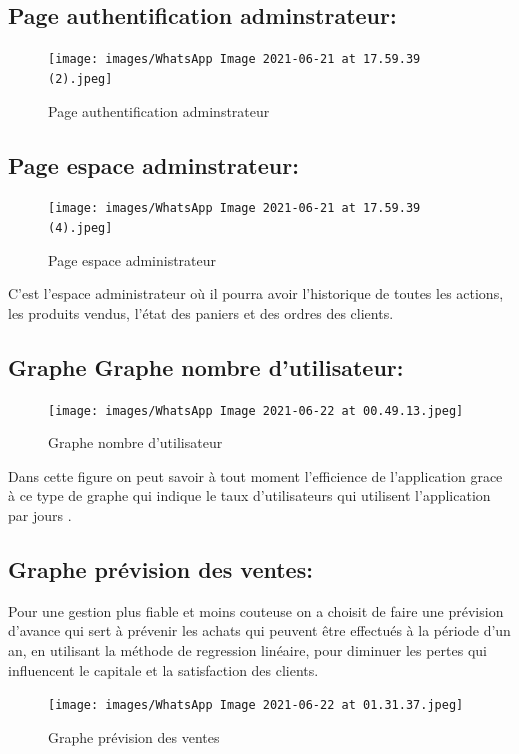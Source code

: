 \documentclass[a4paper,12pt]{report}
\begin{document}
\begin{doublespace}
\begin{doublespace}
\begin{doublespace}
\begin{doublespace}
\begin{doublespace}
\begin{doublespace}
\subsection{Page authentification adminstrateur:}
\begin{figure}[H]
\begin{center}
 \texttt{[image: images/WhatsApp Image 2021-06-21 at 17.59.39 (2).jpeg]}
 \caption{Page authentification adminstrateur}
 \end{center}
\end{figure}
\subsection{Page espace adminstrateur:}
\begin{figure}[H]
\begin{center}
 \texttt{[image: images/WhatsApp Image 2021-06-21 at 17.59.39 (4).jpeg]}
 \caption{Page espace administrateur}
 \end{center}
\end{figure}
C'est l'espace administrateur où il pourra avoir l'historique de toutes les actions, les produits vendus, l'état des paniers et des ordres des clients. 
\subsection{Graphe Graphe nombre d'utilisateur:}

\begin{figure}[H]
\begin{center}
 \texttt{[image: images/WhatsApp Image 2021-06-22 at 00.49.13.jpeg]}
 \caption{Graphe nombre d'utilisateur}
 \end{center}
 \end{figure}
Dans cette figure on peut savoir à tout moment l'efficience de l'application grace à ce type de graphe qui indique le taux d'utilisateurs qui utilisent l'application par jours .
 \subsection{Graphe prévision des ventes:}
Pour une gestion plus fiable et moins couteuse on a choisit de faire une prévision d'avance qui sert à prévenir les achats qui peuvent être effectués à la période d'un an, en utilisant la méthode de regression linéaire, pour diminuer les pertes qui influencent le capitale et la satisfaction des clients.
\begin{figure}[H]
\begin{center}
 \texttt{[image: images/WhatsApp Image 2021-06-22 at 01.31.37.jpeg]}
 \caption{Graphe prévision des ventes}
 \end{center}
 \end{figure}

\end{doublespace}
\end{doublespace}
\end{doublespace}
\end{doublespace}
\end{doublespace}
\end{doublespace}
\end{document}
